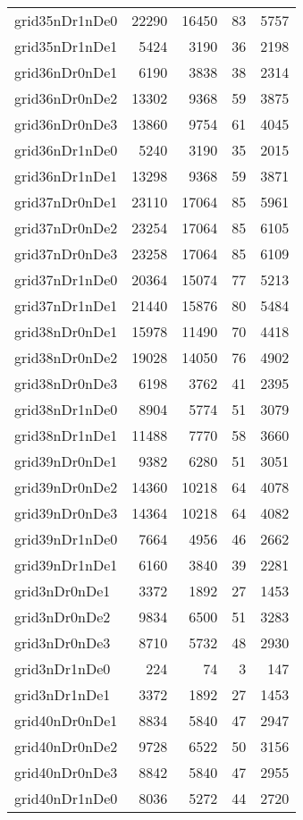 \begin{tabular}{lrrrr}
grid35nDr1nDe0 & 22290 & 16450 & 83 & 5757 \\
grid35nDr1nDe1 & 5424 & 3190 & 36 & 2198 \\
grid36nDr0nDe1 & 6190 & 3838 & 38 & 2314 \\
grid36nDr0nDe2 & 13302 & 9368 & 59 & 3875 \\
grid36nDr0nDe3 & 13860 & 9754 & 61 & 4045 \\
grid36nDr1nDe0 & 5240 & 3190 & 35 & 2015 \\
grid36nDr1nDe1 & 13298 & 9368 & 59 & 3871 \\
grid37nDr0nDe1 & 23110 & 17064 & 85 & 5961 \\
grid37nDr0nDe2 & 23254 & 17064 & 85 & 6105 \\
grid37nDr0nDe3 & 23258 & 17064 & 85 & 6109 \\
grid37nDr1nDe0 & 20364 & 15074 & 77 & 5213 \\
grid37nDr1nDe1 & 21440 & 15876 & 80 & 5484 \\
grid38nDr0nDe1 & 15978 & 11490 & 70 & 4418 \\
grid38nDr0nDe2 & 19028 & 14050 & 76 & 4902 \\
grid38nDr0nDe3 & 6198 & 3762 & 41 & 2395 \\
grid38nDr1nDe0 & 8904 & 5774 & 51 & 3079 \\
grid38nDr1nDe1 & 11488 & 7770 & 58 & 3660 \\
grid39nDr0nDe1 & 9382 & 6280 & 51 & 3051 \\
grid39nDr0nDe2 & 14360 & 10218 & 64 & 4078 \\
grid39nDr0nDe3 & 14364 & 10218 & 64 & 4082 \\
grid39nDr1nDe0 & 7664 & 4956 & 46 & 2662 \\
grid39nDr1nDe1 & 6160 & 3840 & 39 & 2281 \\
grid3nDr0nDe1 & 3372 & 1892 & 27 & 1453 \\
grid3nDr0nDe2 & 9834 & 6500 & 51 & 3283 \\
grid3nDr0nDe3 & 8710 & 5732 & 48 & 2930 \\
grid3nDr1nDe0 & 224 & 74 & 3 & 147 \\
grid3nDr1nDe1 & 3372 & 1892 & 27 & 1453 \\
grid40nDr0nDe1 & 8834 & 5840 & 47 & 2947 \\
grid40nDr0nDe2 & 9728 & 6522 & 50 & 3156 \\
grid40nDr0nDe3 & 8842 & 5840 & 47 & 2955 \\
grid40nDr1nDe0 & 8036 & 5272 & 44 & 2720 \\

\end{tabular}
